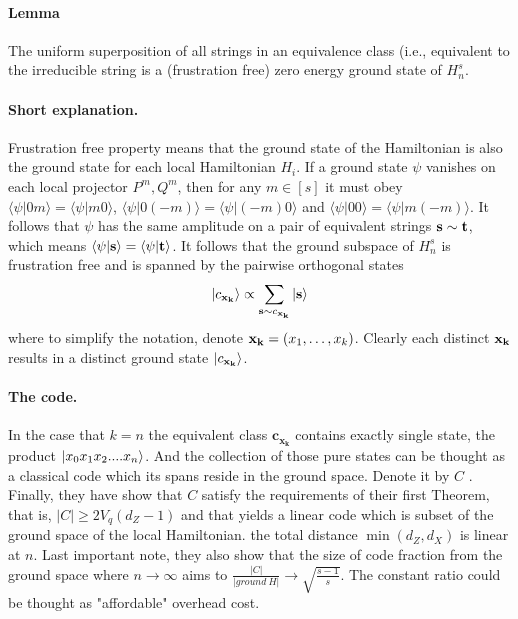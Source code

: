 \documentclass{article}
\begin{document}
\paragraph{Lemma} The uniform superposition of all strings in an equivalence
class (i.e., equivalent to the irreducible string 
 is a (frustration free) zero energy ground state of $H^s_n$.

\paragraph{Short explanation.} Frustration free property means that the ground state of the Hamiltonian is also the ground state for each local Hamiltonian \(H_i\). If a ground state $\psi$ vanishes
on each local projector \(P^m , Q^m\), then for any $m\in[s]$ it must obey $\langle\psi|0m\rangle=\langle\psi|m0\rangle$,
$\langle\psi|0(-m)\rangle=\langle\psi|(-m)0\rangle$ and $\langle\psi|00\rangle=\langle\psi|m(-m)\rangle$.
It follows that $\psi$ has the same amplitude on a pair of equivalent
strings ${\bf s}\sim{\bf t}$, which means $\langle\psi|{\bf s}\rangle=\langle\psi|{\bf t}\rangle$.
It follows that the ground subspace of $H_{n}^{s}$ is frustration
free and is spanned by the pairwise orthogonal states
\begin{equation}
|c_{{\bf x_{k}}}\rangle\propto\sum_{{\bf s}\sim c_{{\bf x_{k}}}}|{\bf s}\rangle\label{eq:AllGroundStates}
\end{equation}
where to simplify the notation, denote ${\bf x_{k}}=(x_{1},\dots,x_{k})$.
Clearly each distinct ${\bf x_{k}}$ results in a distinct ground
state $|c_{{\bf x_{k}}}\rangle$. 


\paragraph{The code.} In the case that \(k = n\) the equivalent class  \(\mathbf{c_{x_{k}}} \) contains exactly single state, the product \( \ket{x_0 x_1 x_2 .... x_n} \). And the collection of those pure states can be thought as a classical code which its spans reside in the ground space. Denote it by \(C\) . Finally, they have show that \( C \) satisfy the requirements of their first Theorem, that is, \( |C| \ge 2V_q \left(d_Z -1 \right) \) and that yields a linear code which is subset of the ground space of the local Hamiltonian. the total distance \( \min \left( d_Z, d_X \right) \) is linear at \(n\). Last important note, they also show that the size of code fraction from the ground space where \(n\rightarrow\infty\) aims to \( \frac{|C|}{ |ground\ H |} \rightarrow \sqrt{\frac{s-1}{s}} \). The constant ratio could be thought as "affordable" overhead cost.
\end{document}
